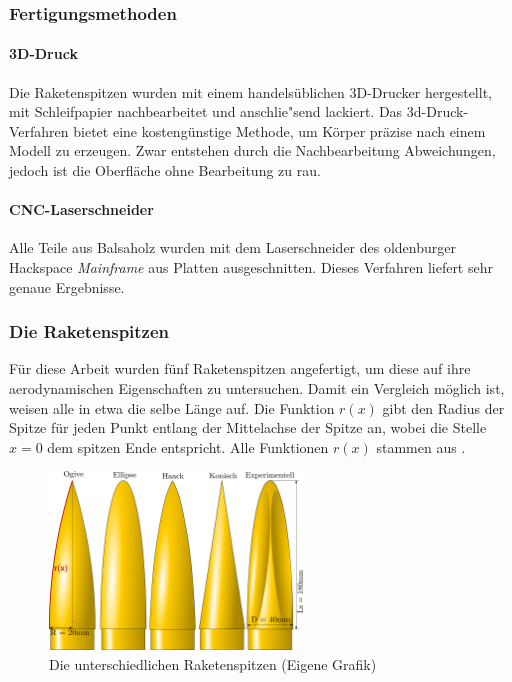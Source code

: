 \documentclass[10pt,a4paper]{article}
\begin{document}
\subsubsection{Fertigungsmethoden}
\label{sssec-Fertigungsmethoden}

\paragraph{3D-Druck}
Die Raketenspitzen wurden mit einem handelsüblichen 3D-Drucker hergestellt, mit Schleifpapier nachbearbeitet und anschlie"send lackiert. Das 3d-Druck-Verfahren bietet eine kostengünstige Methode, um Körper präzise nach einem Modell zu erzeugen. Zwar entstehen durch die Nachbearbeitung Abweichungen, jedoch ist die Oberfläche ohne Bearbeitung zu rau.

\paragraph{CNC-Laserschneider}
Alle Teile aus Balsaholz wurden mit dem Laserschneider des oldenburger Hackspace \emph{Mainframe} aus Platten ausgeschnitten. Dieses Verfahren liefert sehr genaue Ergebnisse.


\subsubsection{Die Raketenspitzen}
\label{sssec-Reketenspitzen}

Für diese Arbeit wurden fünf Raketenspitzen angefertigt, um diese auf ihre aerodynamischen Eigenschaften zu untersuchen. Damit ein Vergleich möglich ist, weisen alle in etwa die selbe Länge auf.
Die Funktion $r(x)$ gibt den Radius der Spitze für jeden Punkt entlang der Mittelachse der Spitze an, wobei die Stelle $x=0$ dem spitzen Ende entspricht. Alle Funktionen $r(x)$ stammen aus \cite{sn}.

\begin{figure}[h]
	\centering
	\includegraphics[width=0.6\textwidth]{Bilder/Raketenspitzen.png}
	\caption{Die unterschiedlichen Raketenspitzen (Eigene Grafik)}
	\label{fig-Raketenspitzen}
\end{figure}
\end{document}
